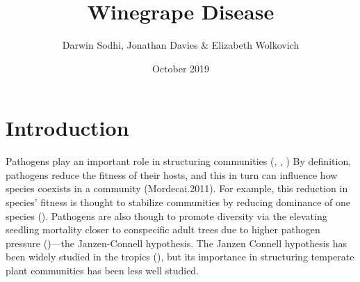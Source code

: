 \documentclass[12pt,letter]{article}
\begin{document}
\title{Winegrape Disease}
\author{Darwin Sodhi, Jonathan Davies & Elizabeth Wolkovich }
\date{October 2019}


\maketitle

\section{Introduction}

Pathogens play an important role in structuring communities (\cite{Janzen1970}, \cite{Connell1978}, \cite{Bush1997}) By definition, pathogens reduce the fitness of their hosts, and this in turn can influence how species coexists in a community (Mordecai.2011). For example, this reduction in species’ fitness is thought to stabilize communities by reducing dominance of one species (\cite{Chesson2000}). Pathogens are also though to promote diversity via the elevating seedling mortality closer to conspecific adult trees due to higher pathogen pressure (\cite{HilleRisLambers2012})---the Janzen-Connell hypothesis. The Janzen Connell hypothesis has been widely studied in the tropics (\cite{Clark2012}), but its importance in structuring temperate plant communities has been less well studied. 
\end{document}
